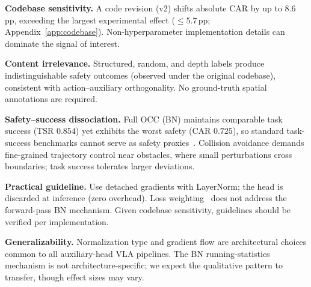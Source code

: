 \textbf{Codebase sensitivity.} A code revision (v2) shifts absolute CAR by up to 8.6\,pp, exceeding the largest experimental effect (${\leq}5.7$\,pp; Appendix~\ref{app:codebase}). Non-hyperparameter implementation details can dominate the signal of interest.

\textbf{Content irrelevance.} Structured, random, and depth labels produce indistinguishable safety outcomes (observed under the original codebase), consistent with action--auxiliary orthogonality. No ground-truth spatial annotations are required.

\textbf{Safety--success dissociation.} Full OCC (BN) maintains comparable task success (TSR $0.854$) yet exhibits the worst safety (CAR $0.725$), so standard task-success benchmarks cannot serve as safety proxies~\cite{li2026spatialforcing, yuan2025depthvla, wu2025spatialvla, liu2025occvla}. Collision avoidance demands fine-grained trajectory control near obstacles, where small perturbations cross boundaries; task success tolerates larger deviations.

\textbf{Practical guideline.} Use detached gradients with LayerNorm; the head is discarded at inference (zero overhead). Loss weighting~\cite{kendall2018uncertainty} does not address the forward-pass BN mechanism. Given codebase sensitivity, guidelines should be verified per implementation.

\textbf{Generalizability.} Normalization type and gradient flow are architectural choices common to all auxiliary-head VLA pipelines. The BN running-statistics mechanism is not architecture-specific; we expect the qualitative pattern to transfer, though effect sizes may vary.
